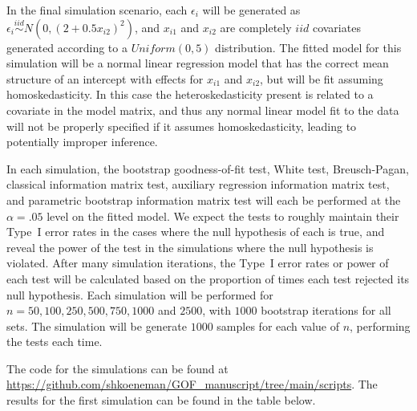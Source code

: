 \documentclass[submit]{smj}
\begin{document}
In the final simulation scenario, each $\epsilon_i$ will be generated as $\epsilon_i \stackrel{iid}{\sim} N \left( 0,(2 + 0.5 x_{i2})^2 \right)$, and $x_{i1}$ and $x_{i2}$ are completely $iid$ covariates generated according to
a $Uniform(0,5)$ distribution. The fitted model for this simulation will be a normal linear regression model that has the correct mean structure of an intercept with effects for $x_{i1}$ and $x_{i2}$,
but will be fit assuming homoskedasticity. In this case the heteroskedasticity present is related to a covariate in the model matrix, and thus any normal linear model fit to the data will not be properly
specified if it assumes homoskedasticity, leading to potentially improper inference.

In each simulation, the bootstrap goodness-of-fit test, White test, Breusch-Pagan, classical information matrix test, auxiliary regression information matrix test, and parametric bootstrap information matrix test will each be performed at the $\alpha = .05$ level on the  fitted model. We expect the tests to roughly maintain their
Type~I error rates in the cases where the null hypothesis of each is true, and reveal the power of the test in the simulations where the null hypothesis is violated. After many simulation iterations, the
Type~I error rates or power of each test will be calculated based on the proportion of times each test rejected its null hypothesis. Each simulation will be performed for $n = 50, 100, 250, 500, 750, 1000$ and $2500$, with $1000$
bootstrap iterations for all sets. The simulation will be generate $1000$ samples for each value of $n$, performing the tests each time.

The code for the simulations can be found at \url{https://github.com/shkoeneman/GOF_manuscript/tree/main/scripts}. The results for the first simulation
can be found in the table below.

\begin{table}[H]
	\centering
	
	\small\addtolength{\tabcolsep}{-3pt}
	\setlength\extrarowheight{-3pt}
	{
	}
\end{table}
\end{document}
